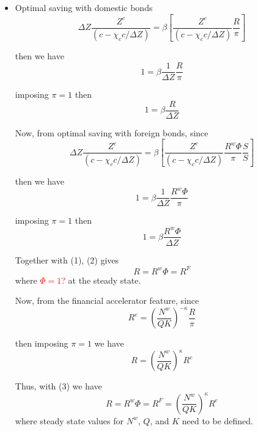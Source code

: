 \documentclass[11pt,titlepage]{article}
\begin{document}
\begin{itemize}
\item Optimal saving with domestic bonds
\begin{equation*}
\Delta Z\frac{Z^c}{(c - \chi_c c/{\Delta Z})} = \beta \left[ \frac{Z^c}{(c - \chi_c c/{\Delta Z})} \frac{R}{\pi} \right]
\end{equation*}

then we have
\begin{equation*}
1 = \beta \frac{1}{\Delta Z} \frac{R}{\pi}
\end{equation*}

imposing $\pi=1$ then
\begin{equation}
1 = \beta \frac{R}{\Delta Z}
\end{equation}

Now, from optimal saving with foreign bonds, since
\begin{equation*}
\Delta Z\frac{Z^c}{(c - \chi_c c/{\Delta Z})} = \beta \left[ \frac{Z^c}{(c - \chi_c c/{\Delta Z})} \frac{R^{w}\Phi}{\pi} \frac{S}{S} \right]
\end{equation*}

then we have
\begin{equation*}
1 = \beta \frac{1}{\Delta Z} \frac{R^{w}\Phi}{\pi}
\end{equation*}

imposing $\pi=1$ then
\begin{equation}
1 = \beta \frac{R^{w}\Phi}{\Delta Z}
\end{equation}

Together with (1), (2) gives
\begin{equation}
R = R^{w}\Phi = R^{F}
\end{equation}
where \textcolor{red}{$\Phi=1$?} at the steady state.

Now, from the financial accelerator feature, since
\begin{equation*}
R^e = \left(\frac{N^w}{QK}\right)^{-\kappa} \frac{R}{\pi}
\end{equation*}

then imposing $\pi=1$ we have
\begin{equation*}
R = \left(\frac{N^w}{QK}\right)^{\kappa} R^e
\end{equation*}

Thus, with (3) we have
\begin{equation}
R = R^{w}\Phi = R^{F} = \left(\frac{N^w}{QK}\right)^{\kappa} R^e
\end{equation}
where steady state values for $N^{w}$, $Q$, and $K$ need to be defined.


\end{itemize}
\end{document}
